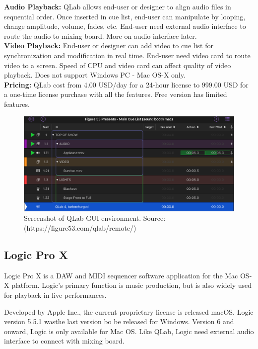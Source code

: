 \textbf{Audio Playback:} QLab allows end-user or designer to align audio files in sequential order. Once inserted in cue list, end-user can manipulate by looping, change amplitude, volume, fades, etc. End-user need external audio interface to route the audio to mixing board. More on audio interface later. \\

\textbf{Video Playback:} End-user or designer can add video to cue list for synchronization and modification in real time. End-user need video card to route video to a screen. Speed of CPU and video card can affect quality of video playback. Does not support Windows PC - Mac OS-X only. \\

\textbf{Pricing:} QLab cost from 4.00 USD/day for a 24-hour license to 999.00 USD for a one-time license purchase with all the features. Free version has limited features.

\begin{figure}[H]
\centering
\includegraphics[scale=0.8]{./pictures/qlab.png}
\caption{Screenshot of QLab GUI environment. Source: (https://figure53.com/qlab/remote/)}
\label{fig:qlab.png}
\end{figure}

\subsection{Logic Pro X}
Logic Pro X is a DAW and MIDI sequencer software application for the Mac OS-X platform. Logic's primary function is music production, but is also widely used for playback in live performances. \newline

Developed by Apple Inc., the current proprietary license is released macOS. Logic version 5.5.1 wasthe last version bo be released for Windows. Version 6 and onward, Logic is only available for Mac OS. Like QLab, Logic need external audio interface to connect with mixing board. \\
 
